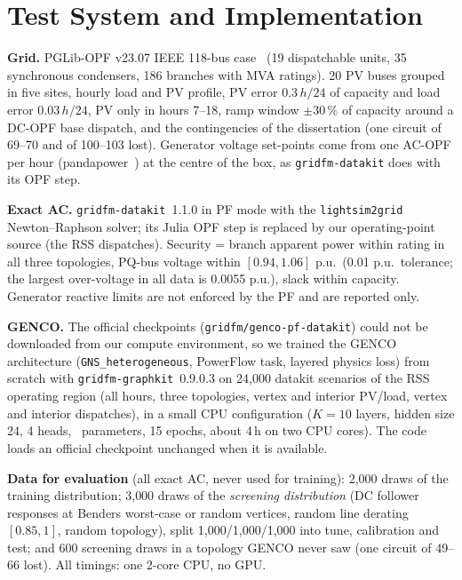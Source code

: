 \section{Test System and Implementation}
\label{sec:setup}
\textbf{Grid.} PGLib-OPF v23.07 IEEE 118-bus case~\cite{pglib} (19 dispatchable units, 35 synchronous
condensers, 186 branches with MVA ratings). 20 PV buses grouped in five sites, hourly
load and PV profile, PV error $0.3\,h/24$ of capacity and load error $0.03\,h/24$, PV only
in hours 7--18, ramp window $\pm30\,\%$ of capacity around a DC-OPF base dispatch, and
the contingencies of the dissertation (one circuit of 69--70 and of 100--103 lost).
Generator voltage set-points come from one AC-OPF per hour (pandapower~\cite{pandapower}) at the centre of
the box, as \texttt{gridfm-datakit} does with its OPF step.

\textbf{Exact AC.} \texttt{gridfm-datakit}~1.1.0 in PF mode with the
\texttt{lightsim2grid} Newton--Raphson solver; its Julia OPF step is replaced by our
operating-point source (the RSS dispatches). Security = branch apparent power within
rating in all three topologies, PQ-bus voltage within $[0.94,1.06]$ p.u.\ (0.01 p.u.\
tolerance; the largest over-voltage in all data is 0.0055 p.u.), slack within capacity.
Generator reactive limits are not enforced by the PF and are reported only.

\textbf{GENCO.} The official checkpoints (\texttt{gridfm/genco-pf-datakit}) could not be
downloaded from our compute environment, so we trained the GENCO architecture
(\texttt{GNS\_heterogeneous}, PowerFlow task, layered physics loss) from scratch with
\texttt{gridfm-graphkit}~0.9.0.3 on 24{,}000 datakit scenarios of the RSS operating
region (all hours, three topologies, vertex and interior PV/load, vertex and interior
dispatches), in a small CPU configuration ($K=10$ layers, hidden size 24, 4 heads,
\NGencoParams\ parameters, 15 epochs, about 4\,h on two CPU cores). The code loads an
official checkpoint unchanged when it is available.

\textbf{Data for evaluation} (all exact AC, never used for training): 2{,}000 draws of
the training distribution; 3{,}000 draws of the \emph{screening distribution} (DC
follower responses at Benders worst-case or random vertices, random line derating
$[0.85,1]$, random topology), split 1{,}000/1{,}000/1{,}000 into tune, calibration and
test; and 600 screening draws in a topology GENCO never saw (one circuit of 49--66 lost).
All timings: one 2-core CPU, no GPU.
